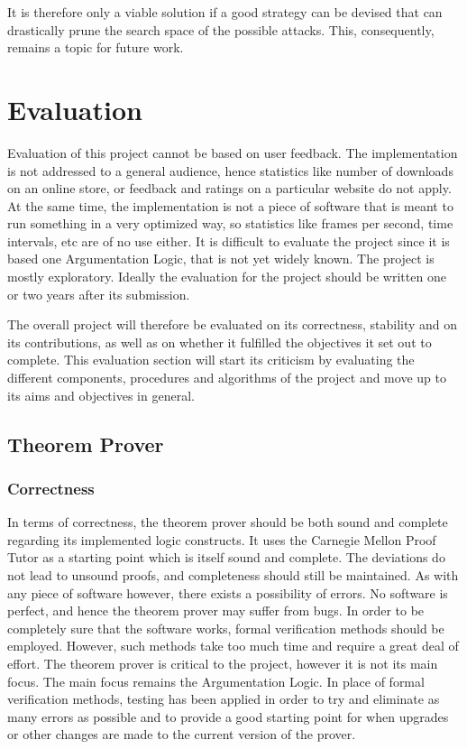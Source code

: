 \documentclass[11pt,twoside,a4paper]{report}
\begin{document}
It is therefore only a viable solution if a good strategy can be devised that can drastically prune the search space of the possible attacks. This, consequently, remains a topic for future work.

\chapter{Evaluation}
\label{chap:eval}
Evaluation of this project cannot be based on user feedback. The implementation is not addressed to a general audience, hence statistics like number of downloads on an online store, or feedback and ratings on a particular website do not apply. At the same time, the implementation is not a piece of software that is meant to run something in a very optimized way, so statistics like frames per second, time intervals, etc are of no use either. It is difficult to evaluate the project since it is based one Argumentation Logic, that is not yet widely known. The project is mostly exploratory. Ideally the evaluation for the project should be written one or two years after its submission.

The overall project will therefore be evaluated on its correctness, stability and on its contributions, as well as on whether it fulfilled the objectives it set out to complete. This evaluation section will start its criticism by evaluating the different components, procedures and algorithms of the project and move up to its aims and objectives in general.

\section{Theorem Prover}
\label{sec:tpeval}

\subsection{Correctness}
In terms of correctness, the theorem prover should be both sound and complete regarding its implemented logic constructs. It uses the Carnegie Mellon Proof Tutor as a starting point which is itself sound and complete. The deviations do not lead to unsound proofs, and completeness should still be maintained. As with any piece of software however, there exists a possibility of errors. No software is perfect, and hence the theorem prover may suffer from bugs. In order to be completely sure that the software works, formal verification methods should be employed. However, such methods take too much time and require a great deal of effort. The theorem prover is critical to the project, however it is not its main focus. The main focus remains the Argumentation Logic. In place of formal verification methods, testing has been applied in order to try and eliminate as many errors as possible and to provide a good starting point for when upgrades or other changes are made to the current version of the prover.
\end{document}
